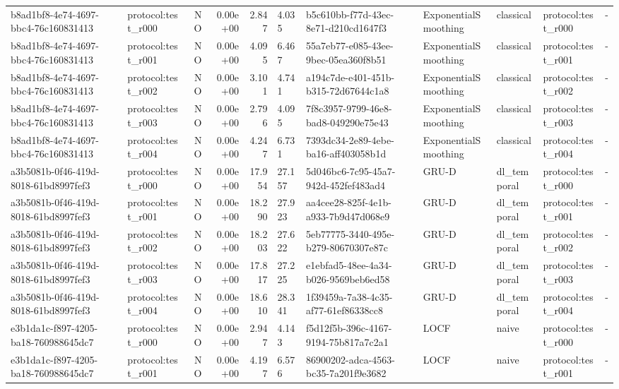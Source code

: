 \begin{table}[htbp]
\begin{tabular}{llrrr}
b8ad1bf8-4e74-4697-bbc4-76c160831413 & protocol:test\_r000 & NO & 0.00e+00 & 2.847 & 4.035 & b5c610bb-f77d-43ec-8e71-d210cd1647f3 & ExponentialSmoothing & classical & protocol:test\_r000 & - \\
b8ad1bf8-4e74-4697-bbc4-76c160831413 & protocol:test\_r001 & NO & 0.00e+00 & 4.095 & 6.467 & 55a7eb77-e085-43ee-9bec-05ea360f8b51 & ExponentialSmoothing & classical & protocol:test\_r001 & - \\
b8ad1bf8-4e74-4697-bbc4-76c160831413 & protocol:test\_r002 & NO & 0.00e+00 & 3.101 & 4.741 & a194c7de-e401-451b-b315-72d67644c1a8 & ExponentialSmoothing & classical & protocol:test\_r002 & - \\
b8ad1bf8-4e74-4697-bbc4-76c160831413 & protocol:test\_r003 & NO & 0.00e+00 & 2.796 & 4.095 & 7f8c3957-9799-46e8-bad8-049290e75e43 & ExponentialSmoothing & classical & protocol:test\_r003 & - \\
b8ad1bf8-4e74-4697-bbc4-76c160831413 & protocol:test\_r004 & NO & 0.00e+00 & 4.247 & 6.731 & 7393dc34-2e89-4ebe-ba16-aff403058b1d & ExponentialSmoothing & classical & protocol:test\_r004 & - \\
a3b5081b-0f46-419d-8018-61bd8997fef3 & protocol:test\_r000 & NO & 0.00e+00 & 17.954 & 27.157 & 5d046bc6-7c95-45a7-942d-452fef483ad4 & GRU-D & dl\_temporal & protocol:test\_r000 & - \\
a3b5081b-0f46-419d-8018-61bd8997fef3 & protocol:test\_r001 & NO & 0.00e+00 & 18.290 & 27.923 & aa4cee28-825f-4e1b-a933-7b9d47d068e9 & GRU-D & dl\_temporal & protocol:test\_r001 & - \\
a3b5081b-0f46-419d-8018-61bd8997fef3 & protocol:test\_r002 & NO & 0.00e+00 & 18.203 & 27.622 & 5eb77775-3440-495e-b279-80670307e87c & GRU-D & dl\_temporal & protocol:test\_r002 & - \\
a3b5081b-0f46-419d-8018-61bd8997fef3 & protocol:test\_r003 & NO & 0.00e+00 & 17.817 & 27.225 & e1ebfad5-48ee-4a34-b026-9569beb6ed58 & GRU-D & dl\_temporal & protocol:test\_r003 & - \\
a3b5081b-0f46-419d-8018-61bd8997fef3 & protocol:test\_r004 & NO & 0.00e+00 & 18.610 & 28.341 & 1f39459a-7a38-4c35-af77-61ef86338cc8 & GRU-D & dl\_temporal & protocol:test\_r004 & - \\
e3b1da1c-f897-4205-ba18-760988645dc7 & protocol:test\_r000 & NO & 0.00e+00 & 2.947 & 4.143 & f5d12f5b-396c-4167-9194-75b817a7c2a1 & LOCF & naive & protocol:test\_r000 & - \\
e3b1da1c-f897-4205-ba18-760988645dc7 & protocol:test\_r001 & NO & 0.00e+00 & 4.197 & 6.576 & 86900202-adca-4563-bc35-7a201f9e3682 & LOCF & naive & protocol:test\_r001 & - \\

\end{tabular}
\end{table}
